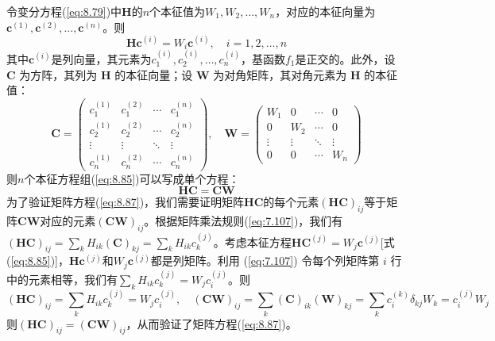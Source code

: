     令变分方程(\ref{eq:8.79})中$\mathbf{H}$的$n$个本征值为$W_1,W_2,\ldots,W_n$，对应的本征向量为$\mathbf{c}^{\left(1\right)},\mathbf{c}^{\left(2\right)},\ldots,\mathbf{c}^{\left(n\right)}$。则
    \begin{equation}
        \mathbf{H}\mathbf{c}^{\left(i\right)} = W_i\mathbf{c}^{\left(i\right)}, \quad i = 1,2,\ldots,n
        \label{eq:8.85}
    \end{equation}
    其中$\mathbf{c}^{\left(i\right)}$是列向量，其元素为$c_1^{\left(i\right)},c_2^{\left(i\right)},\ldots,c_n^{\left(i\right)}$，基函数$f_1$是正交的。此外，设 $\mathbf{C}$ 为方阵，其列为 $\mathbf{H}$ 的本征向量；设 $\mathbf{W}$ 为对角矩阵，其对角元素为 $\mathbf{H}$ 的本征值：
    \begin{equation}
        \mathbf{C} = \begin{pmatrix}
            c_1^{\left(1\right)} & c_1^{\left(2\right)} & \cdots & c_1^{\left(n\right)} \\
            c_2^{\left(1\right)} & c_2^{\left(2\right)} & \cdots & c_2^{\left(n\right)} \\
            \vdots & \vdots & \ddots & \vdots \\
            c_n^{\left(1\right)} & c_n^{\left(2\right)} & \cdots & c_n^{\left(n\right)}
        \end{pmatrix}, \quad \mathbf{W} = \begin{pmatrix}
            W_1 & 0 & \cdots & 0 \\
            0 & W_2 & \cdots & 0 \\
            \vdots & \vdots & \ddots & \vdots \\
            0 & 0 & \cdots & W_n
        \end{pmatrix}
        \label{eq:8.86}
    \end{equation}
    则$n$个本征方程组(\ref{eq:8.85})可以写成单个方程：
    \begin{equation}
        \mathbf{H}\mathbf{C} = \mathbf{C}\mathbf{W}
        \label{eq:8.87}
    \end{equation}
    为了验证矩阵方程(\ref{eq:8.87})，我们需要证明矩阵$\mathbf{HC}$的每个元素$\left(\mathbf{HC}\right)_{ij}$等于矩阵$\mathbf{CW}$对应的元素$\left(\mathbf{CW}\right)_{ij}$。根据矩阵乘法规则(\ref{eq:7.107})，我们有$\left(\mathbf{HC}\right)_{ij} = \sum_{k}H_{ik}\left(\mathbf{C}\right)_{kj} = \sum_{k}H_{ik}c_k^{\left(j\right)}$。考虑本征方程$\mathbf{H}\mathbf{C} ^{\left(j\right)} = W_j\mathbf{c}^{\left(j\right)}$[式(\ref{eq:8.85})]，$\mathbf{H}\mathbf{c}^{\left(j\right)}$和$W_j\mathbf{c}^{\left(j\right)}$都是列矩阵。利用 (\ref{eq:7.107}) 令每个列矩阵第 $i$ 行中的元素相等，我们有$\sum_{k}H_{ik}c_k^{\left(j\right)} = W_jc_i^{\left(j\right)}$。则
    \begin{equation*}
        \left(\mathbf{HC}\right)_{ij} = \sum_{k}H_{ik}c_k^{\left(j\right)} = W_jc_i^{\left(j\right)}, \quad \left(\mathbf{CW}\right)_{ij} = \sum_{k}\left(\mathbf{C}\right)_{ik}\left(\mathbf{W}\right)_{kj} = \sum_{k}c_i^{\left(k\right)}\delta_{kj}W_k = c_i^{\left(j\right)}W_j
    \end{equation*}
    则$\left(\mathbf{HC}\right)_{ij} = \left(\mathbf{CW}\right)_{ij}$，从而验证了矩阵方程(\ref{eq:8.87})。

